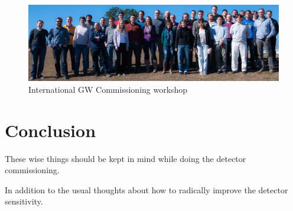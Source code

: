 \begin{figure}[h]
\centering
\includegraphics[width=\columnwidth]{Figures/GroupPhoto_LLOworkshop13.jpg}
\caption{International GW Commissioning workshop}
\label{fig:workshopPhotoLLO}
\end{figure}

\section{Conclusion}
These wise things should be kept in mind while doing the detector commissioning.

In addition to the usual thoughts about how to radically improve the detector sensitivity.
